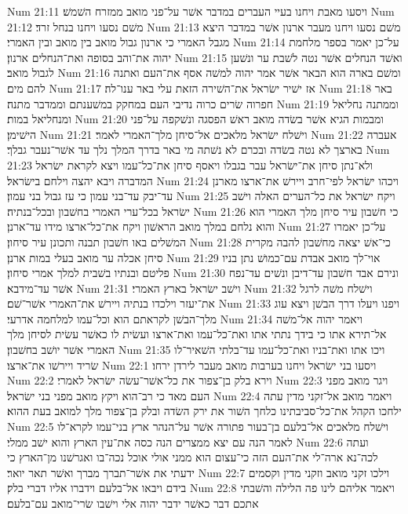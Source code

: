 Num 21:11  ויסעו מאבת ויחנו בעיי העברים במדבר אשׁר על־פני מואב ממזרח השׁמשׁ׃
Num 21:12  משׁם נסעו ויחנו בנחל זרד׃
Num 21:13  משׁם נסעו ויחנו מעבר ארנון אשׁר במדבר היצא מגבל האמרי כי ארנון גבול מואב בין מואב ובין האמרי׃
Num 21:14  על־כן יאמר בספר מלחמת יהוה את־והב בסופה ואת־הנחלים ארנון׃
Num 21:15  ואשׁד הנחלים אשׁר נטה לשׁבת ער ונשׁען לגבול מואב׃
Num 21:16  ומשׁם בארה הוא הבאר אשׁר אמר יהוה למשׁה אסף את־העם ואתנה להם מים׃
Num 21:17  אז ישׁיר ישׂראל את־השׁירה הזאת עלי באר ענו־לה׃
Num 21:18  באר חפרוה שׂרים כרוה נדיבי העם במחקק במשׁענתם וממדבר מתנה׃
Num 21:19  וממתנה נחליאל ומנחליאל במות׃
Num 21:20  ומבמות הגיא אשׁר בשׂדה מואב ראשׁ הפסגה ונשׁקפה על־פני הישׁימן׃
Num 21:21  וישׁלח ישׂראל מלאכים אל־סיחן מלך־האמרי לאמר׃
Num 21:22  אעברה בארצך לא נטה בשׂדה ובכרם לא נשׁתה מי באר בדרך המלך נלך עד אשׁר־נעבר גבלך׃
Num 21:23  ולא־נתן סיחן את־ישׂראל עבר בגבלו ויאסף סיחן את־כל־עמו ויצא לקראת ישׂראל המדברה ויבא יהצה וילחם בישׂראל׃
Num 21:24  ויכהו ישׂראל לפי־חרב ויירשׁ את־ארצו מארנן עד־יבק עד־בני עמון כי עז גבול בני עמון׃
Num 21:25  ויקח ישׂראל את כל־הערים האלה וישׁב ישׂראל בכל־ערי האמרי בחשׁבון ובכל־בנתיה׃
Num 21:26  כי חשׁבון עיר סיחן מלך האמרי הוא והוא נלחם במלך מואב הראשׁון ויקח את־כל־ארצו מידו עד־ארנן׃
Num 21:27  על־כן יאמרו המשׁלים באו חשׁבון תבנה ותכונן עיר סיחון׃
Num 21:28  כי־אשׁ יצאה מחשׁבון להבה מקרית סיחן אכלה ער מואב בעלי במות ארנן׃
Num 21:29  אוי־לך מואב אבדת עם־כמושׁ נתן בניו פליטם ובנתיו בשׁבית למלך אמרי סיחון׃
Num 21:30  ונירם אבד חשׁבון עד־דיבן ונשׁים עד־נפח אשׁר עד־מידבא׃
Num 21:31  וישׁב ישׂראל בארץ האמרי׃
Num 21:32  וישׁלח משׁה לרגל את־יעזר וילכדו בנתיה ויירשׁ את־האמרי אשׁר־שׁם׃
Num 21:33  ויפנו ויעלו דרך הבשׁן ויצא עוג מלך־הבשׁן לקראתם הוא וכל־עמו למלחמה אדרעי׃
Num 21:34  ויאמר יהוה אל־משׁה אל־תירא אתו כי בידך נתתי אתו ואת־כל־עמו ואת־ארצו ועשׂית לו כאשׁר עשׂית לסיחן מלך האמרי אשׁר יושׁב בחשׁבון׃
Num 21:35  ויכו אתו ואת־בניו ואת־כל־עמו עד־בלתי השׁאיר־לו שׂריד ויירשׁו את־ארצו׃
Num 22:1  ויסעו בני ישׂראל ויחנו בערבות מואב מעבר לירדן ירחו׃
Num 22:2  וירא בלק בן־צפור את כל־אשׁר־עשׂה ישׂראל לאמרי׃
Num 22:3  ויגר מואב מפני העם מאד כי רב־הוא ויקץ מואב מפני בני ישׂראל׃
Num 22:4  ויאמר מואב אל־זקני מדין עתה ילחכו הקהל את־כל־סביבתינו כלחך השׁור את ירק השׂדה ובלק בן־צפור מלך למואב בעת ההוא׃
Num 22:5  וישׁלח מלאכים אל־בלעם בן־בעור פתורה אשׁר על־הנהר ארץ בני־עמו לקרא־לו לאמר הנה עם יצא ממצרים הנה כסה את־עין הארץ והוא ישׁב ממלי׃
Num 22:6  ועתה לכה־נא ארה־לי את־העם הזה כי־עצום הוא ממני אולי אוכל נכה־בו ואגרשׁנו מן־הארץ כי ידעתי את אשׁר־תברך מברך ואשׁר תאר יואר׃
Num 22:7  וילכו זקני מואב וזקני מדין וקסמים בידם ויבאו אל־בלעם וידברו אליו דברי בלק׃
Num 22:8  ויאמר אליהם לינו פה הלילה והשׁבתי אתכם דבר כאשׁר ידבר יהוה אלי וישׁבו שׂרי־מואב עם־בלעם׃
